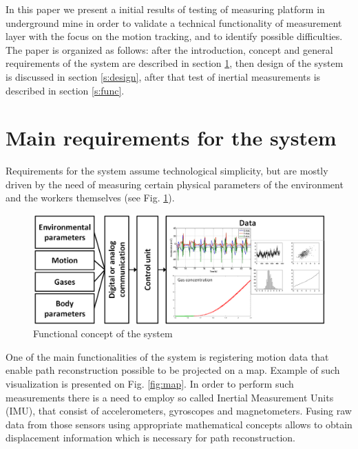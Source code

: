 \documentclass[10pt, a4paper]{article}
\begin{document}
In this paper we present a initial results of testing of measuring platform in underground mine in order to validate a technical functionality of measurement layer with the focus on the motion tracking, and to identify possible difficulties. The paper is organized as follows: after the introduction, concept and general requirements of the system are described in section \ref{s:req}, then design of the system is discussed in section \ref{s:design}, after that test of inertial measurements is described in section \ref{s:func}.

\section{Main requirements for the system}\label{s:req}

Requirements for the system assume technological simplicity, but are mostly driven by the need of measuring certain physical parameters of the environment and the workers themselves (see Fig. \ref{fig:idea}). 

\begin{figure}[ht!]
    \centering
    \includegraphics[width=\textwidth]{fig/idea.png}
    \caption{Functional concept of the system}
    \label{fig:idea}
\end{figure}

One of the main functionalities of the system is registering motion data that enable path reconstruction possible to be projected on a map. Example of such visualization is presented on Fig. \ref{fig:map}. In order to perform such measurements there is a need to employ so called Inertial Measurement Units (IMU), that consist of accelerometers, gyroscopes and magnetometers. Fusing raw data from those sensors using appropriate mathematical concepts allows to obtain displacement information which is necessary for path reconstruction.
\end{document}
